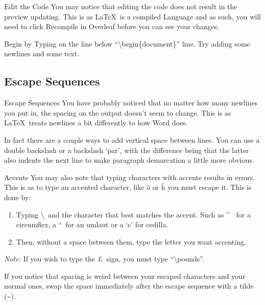 \documentclass{beamer}
\begin{document}
\begin{frame}{Edit the Code}
You may notice that editing the code does not result in the preview updating. This is as \LaTeX~is a compiled Language and as such, you will need to click Recompile in Overleaf before you can see your changes.\par
Begin by Typing on the line below ``\textbackslash begin\{document\}'' line. Try adding some newlines and some text.
\end{frame}

\subsection{Escape Sequences}

\begin{frame}{Escape Sequences}
You have probably noticed that no matter how many newlines you put in, the spacing on the output doesn't seem to change. This is as \LaTeX~treats newlines a bit differently to how Word does.\par
In fact there are a couple ways to add vertical space between lines. You can use a double backslash or a backslash `par', with the difference being that the latter also indents the next line to make paragraph demarcation a little more obvious.
\end{frame}

\begin{frame}{Accents}
You may also note that typing characters with accents results in errors. This is as to type an accented character, like \~o or \^h you must escape it. This is done by:
\begin{enumerate}
\item Typing \textbackslash~and the character that best matches the accent. Such as \^~ for a circumflex, a ``~for an umlaut or a `c' for cedilla. 
\item Then, without a space between them, type the letter you want accenting.
\end{enumerate}\par
\emph{Note:} If you wish to type the \pounds~sign, you must type ``\textbackslash pounds''.\par
If you notice that spacing is weird between your escaped characters and your normal ones, swap the space immediately after the escape sequence with a tilde (\textasciitilde).\par
\end{frame}
\end{document}
